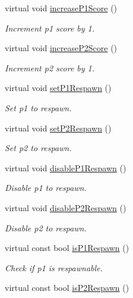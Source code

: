 \begin{DoxyCompactItemize}
virtual void \hyperlink{classGameManagementData_a7d574170fe76a837c05372c8c52eed63}{increase\-P1\-Score} ()
\begin{DoxyCompactList}\small\item\em Increment p1 score by 1. \end{DoxyCompactList}\item 
virtual void \hyperlink{classGameManagementData_a9a7a124ef719be6f9d45c4ec231e7774}{increase\-P2\-Score} ()
\begin{DoxyCompactList}\small\item\em Increment p2 score by 1. \end{DoxyCompactList}\item 
virtual void \hyperlink{classGameManagementData_a1df14e6642056790f6677cbd779c6815}{set\-P1\-Respawn} ()
\begin{DoxyCompactList}\small\item\em Set p1 to respawn. \end{DoxyCompactList}\item 
virtual void \hyperlink{classGameManagementData_a31113c80e1caa2604c98db63d565641a}{set\-P2\-Respawn} ()
\begin{DoxyCompactList}\small\item\em Set p2 to respawn. \end{DoxyCompactList}\item 
virtual void \hyperlink{classGameManagementData_a66c80fd2795e9e95fe47ad5a77263a9b}{disable\-P1\-Respawn} ()
\begin{DoxyCompactList}\small\item\em Disable p1 to respawn. \end{DoxyCompactList}\item 
virtual void \hyperlink{classGameManagementData_a2bcc4361d645773587a722755f53cf29}{disable\-P2\-Respawn} ()
\begin{DoxyCompactList}\small\item\em Disable p2 to respawn. \end{DoxyCompactList}\item 
virtual const bool \hyperlink{classGameManagementData_a2abb452bd5ecd1f8d09b76dc1f909260}{is\-P1\-Respawn} ()
\begin{DoxyCompactList}\small\item\em Check if p1 is respawnable. \end{DoxyCompactList}\item 
virtual const bool \hyperlink{classGameManagementData_a3b94efaf212d65515c1c511a17636b5f}{is\-P2\-Respawn} ()

\end{DoxyCompactItemize}
